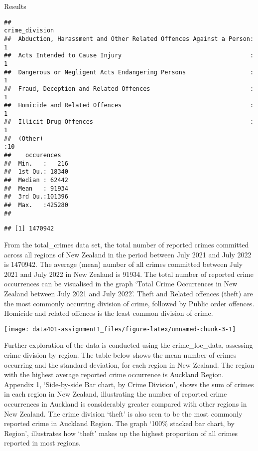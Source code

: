 \documentclass[
  10pt,
]{article}
\begin{document}
Results

\begin{verbatim}
##                                                            crime_division
##  Abduction, Harassment and Other Related Offences Against a Person: 1    
##  Acts Intended to Cause Injury                                    : 1    
##  Dangerous or Negligent Acts Endangering Persons                  : 1    
##  Fraud, Deception and Related Offences                            : 1    
##  Homicide and Related Offences                                    : 1    
##  Illicit Drug Offences                                            : 1    
##  (Other)                                                          :10    
##    occurences    
##  Min.   :   216  
##  1st Qu.: 18340  
##  Median : 62442  
##  Mean   : 91934  
##  3rd Qu.:101396  
##  Max.   :425280  
## 
\end{verbatim}

\begin{verbatim}
## [1] 1470942
\end{verbatim}

From the total\_crimes data set, the total number of reported crimes
committed across all regions of New Zealand in the period between July
2021 and July 2022 is 1470942. The average (mean) number of all crimes
committed between July 2021 and July 2022 in New Zealand is 91934. The
total number of reported crime occurrences can be visualised in the
graph `Total Crime Occurrences in New Zealand between July 2021 and July
2022'. Theft and Related offences (theft) are the most commonly
occurring division of crime, followed by Public order offences. Homicide
and related offences is the least common division of crime.

\begin{center}\texttt{[image: data401-assignment1\_files/figure-latex/unnamed-chunk-3-1]} \end{center}

Further exploration of the data is conducted using the crime\_loc\_data,
assessing crime division by region. The table below shows the mean
number of crimes occurring and the standard deviation, for each region
in New Zealand. The region with the highest average reported crime
occurrence is Auckland Region. Appendix 1, `Side-by-side Bar chart, by
Crime Division', shows the sum of crimes in each region in New Zealand,
illustrating the number of reported crime occurrences in Auckland is
considerably greater compared with other regions in New Zealand. The
crime division `theft' is also seen to be the most commonly reported
crime in Auckland Region. The graph `100\% stacked bar chart, by
Region', illustrates how `theft' makes up the highest proportion of all
crimes reported in most regions.
\end{document}

